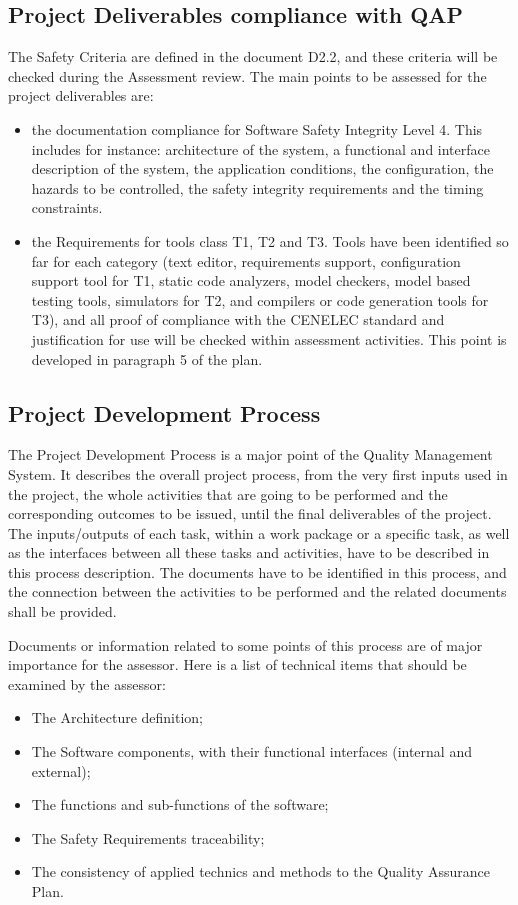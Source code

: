 \documentclass[openetcs]{template/openetcs_article}
\begin{document}
\subsection{Project Deliverables compliance with QAP}
The Safety Criteria are defined in the document D2.2, and these criteria will be checked during the Assessment review. The main points to be assessed
for the project deliverables are:
\begin{itemize}
\item the documentation compliance for Software Safety Integrity Level 4. This includes for instance: architecture of the system, a functional and interface description of the system, the
application conditions, the configuration, the hazards to be controlled, the safety integrity requirements and the timing constraints.
\item the Requirements for tools class T1, T2 and T3. Tools have been identified so far for each category (text editor, requirements support, configuration
support tool for T1, static code analyzers, model checkers, model based testing tools, simulators for T2, and compilers or code generation tools for T3), and
all proof of compliance with the CENELEC standard and justification for use will be checked within assessment activities. This point is developed in
paragraph 5 of the plan.
\end{itemize}

\subsection{Project Development Process}
The Project Development Process is a major point of the Quality Management System. It describes the overall project process, from the very first inputs used in
the project, the whole activities that are going to be performed and the corresponding outcomes to be issued, until the final deliverables of the project. The
inputs/outputs of each task, within a work package or a specific task, as well as the interfaces between all these tasks and activities, have to be described in
this process description.
The documents have to be identified in this process, and the connection  between the activities to be performed and the related documents shall be provided.

Documents or information related to some points of this process are of major importance for the assessor. Here is a list of technical items that should be examined by the assessor:
\begin{itemize}
\item The Architecture definition;
\item The Software components, with their functional interfaces (internal and external);
\item The functions and sub-functions of the software;
\item The Safety Requirements traceability;
\item The consistency of applied technics and methods to the Quality Assurance Plan.
\end{itemize}
\end{document}
